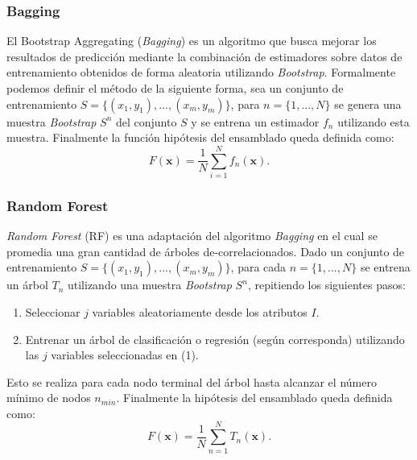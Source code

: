 \documentclass[spanish]{article}
\begin{document}
            
        \subsubsection{Bagging}
        
          El Bootstrap Aggregating (\emph{Bagging}) \cite{breiman1996bagging} es un algoritmo que busca mejorar los resultados 
          de predicción mediante la combinación de estimadores sobre datos de entrenamiento obtenidos 
          de forma aleatoria utilizando \emph{Bootstrap}. Formalmente podemos definir el método de la 
          siguiente forma, sea un conjunto de entrenamiento $S=\{(x_1, y_1), ...,  (x_m, y_m)\}$, para 
          $n=\{1, ..., N\}$ se genera una muestra \emph{Bootstrap} $S^n$ del conjunto $S$ y se entrena 
          un estimador $f_n$ utilizando esta muestra. Finalmente la función hipótesis del ensamblado 
          queda definida como:
          \begin{equation}
              F(\textbf{x}) = \frac1N \sum_{i=1}^N f_n(\textbf{x}).
          \end{equation}
                
                
        \subsubsection{Random Forest}
        
          \emph{Random Forest} (RF) \cite{breiman2001random} es una adaptación del algoritmo \emph{Bagging} en el cual se promedia 
          una gran cantidad de árboles de-correlacionados. Dado un conjunto de entrenamiento 
          $S=\{(x_1, y_1), ..., (x_m, y_m)\}$, para cada $n=\{1, ..., N\}$ se entrena un árbol $T_n$ 
          utilizando una muestra \emph{Bootstrap} $S^n$, repitiendo los siguientes pasos:
          \begin{enumerate}
            \item Seleccionar $j$ variables aleatoriamente desde los atributos $I$.
            \item Entrenar un árbol de clasificación o regresión (según corresponda) utilizando las 
              $j$ variables seleccionadas en (1).
          \end{enumerate}
          
          Esto se realiza para cada nodo terminal del árbol hasta alcanzar el número mínimo de nodos 
          $n_{min}$. Finalmente la hipótesis del ensamblado queda definida como:          
          \begin{equation}
            F(\textbf{x}) = \frac1N \sum_{n=1}^N T_n(\textbf{x}).
          \end{equation}
          
\end{document}
